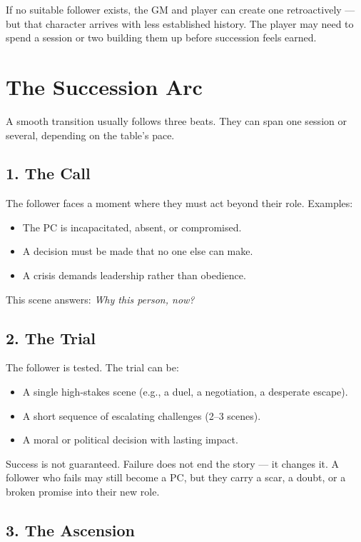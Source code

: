 If no suitable follower exists, the GM and player can create one retroactively --- but that character arrives with less established history. The player may need to spend a session or two building them up before succession feels earned.

\section{The Succession Arc}
\label{sec:succession-arc}

A smooth transition usually follows three beats. They can span one session or several, depending on the table's pace.

\subsection{1. The Call}
\label{subsec:succession-call}

The follower faces a moment where they must act beyond their role. Examples:
\begin{itemize}
  \item The PC is incapacitated, absent, or compromised.
  \item A decision must be made that no one else can make.
  \item A crisis demands leadership rather than obedience.
\end{itemize}
This scene answers: \textit{Why this person, now?}

\subsection{2. The Trial}
\label{subsec:succession-trial}

The follower is tested. The trial can be:
\begin{itemize}
  \item A single high-stakes scene (e.g., a duel, a negotiation, a desperate escape).
  \item A short sequence of escalating challenges (2--3 scenes).
  \item A moral or political decision with lasting impact.
\end{itemize}
Success is not guaranteed. Failure does not end the story --- it changes it. A follower who fails may still become a PC, but they carry a scar, a doubt, or a broken promise into their new role.

\subsection{3. The Ascension}
\label{subsec:succession-ascension}

